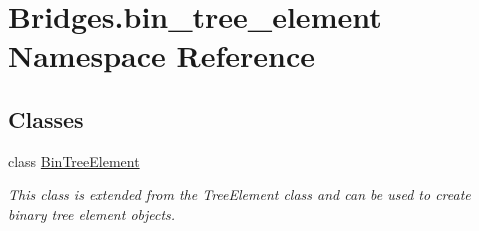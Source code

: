 \hypertarget{namespace_bridges_1_1bin__tree__element}{}\section{Bridges.\+bin\+\_\+tree\+\_\+element Namespace Reference}
\label{namespace_bridges_1_1bin__tree__element}
\subsection*{Classes}
\begin{DoxyCompactItemize}
\item 
class \mbox{\hyperlink{class_bridges_1_1bin__tree__element_1_1_bin_tree_element}{Bin\+Tree\+Element}}
\begin{DoxyCompactList}\small\item\em This class is extended from the Tree\+Element class and can be used to create binary tree element objects. \end{DoxyCompactList}\end{DoxyCompactItemize}
